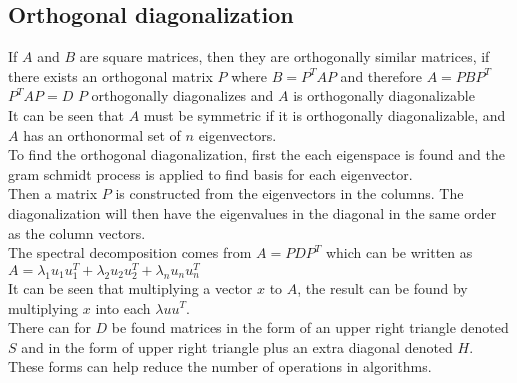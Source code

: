 \documentclass[12pt, a4paper]{article}
\begin{document}
		\subsection{Orthogonal diagonalization}
			If $A$ and $B$ are square matrices, then they are orthogonally similar matrices, if there exists an orthogonal matrix $P$ where $B=P^TAP$ and therefore $A=PBP^T$\\
			$P^TAP=D$ $P$ orthogonally diagonalizes and $A$ is orthogonally diagonalizable\\
			It can be seen that $A$ must be symmetric if it is orthogonally diagonalizable, and $A$ has an orthonormal set of $n$ eigenvectors.\\[4mm]
			To find the orthogonal diagonalization, first the each eigenspace is found and the gram schmidt process is applied to find basis for each eigenvector.\\
			Then a matrix $P$ is constructed from the eigenvectors in the columns. The diagonalization will then have the eigenvalues in the diagonal in the same order as the column vectors.\\[4mm]
			The spectral decomposition comes from $A=PDP^T$ which can be written as $A=\lambda_1u_1u_1^T+\lambda_2u_2u_2^T+\lambda_nu_nu_n^T$\\
			It can be seen that multiplying a vector $x$ to $A$, the result can be found by multiplying $x$ into each $\lambda uu^T$.\\
			There can for $D$ be found matrices in the form of an upper right triangle denoted $S$ and in the form of upper right triangle plus an extra diagonal denoted $H$.\\
			These forms can help reduce the number of operations in algorithms.
			
			
		
				
\end{document}
